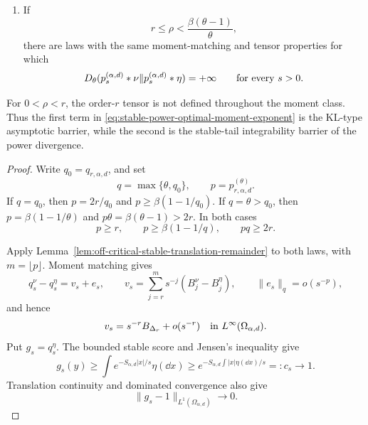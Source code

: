 \begin{theorem}
\begin{enumerate}[label=\textup{(\roman*)}]
\item If
\[
 r\le\rho<\frac{\beta(\theta-1)}\theta,
\]
there are laws with the same moment-matching and tensor properties for
which
\begin{equation}\label{eq:stable-power-domain-sharpness}
 D_\theta(p_s^{(\alpha,d)}*\nu\|
          p_s^{(\alpha,d)}*\eta)=+\infty
 \qquad\hbox{for every }s>0.
\end{equation}
\end{enumerate}
For \(0<\rho<r\), the order-\(r\) tensor is not defined throughout the
moment class.  Thus the first term in
\eqref{eq:stable-power-optimal-moment-exponent} is the KL-type asymptotic
barrier, while the second is the stable-tail integrability barrier of the
power divergence.
\end{theorem}

\begin{proof}
Write \(q_0=q_{r,\alpha,d}\), and set
\[
 q=\max\{\theta,q_0\},
 \qquad p=p_{r,\alpha,d}^{(\theta)}.
\]
If \(q=q_0\), then \(p=2r/q_0\) and
\(p\ge\beta(1-1/q_0)\).  If \(q=\theta>q_0\), then
\(p=\beta(1-1/\theta)\) and \(p\theta=\beta(\theta-1)>2r\).
In both cases
\begin{equation}\label{eq:stable-power-balance-relations}
 p\ge r,\qquad p\ge\beta(1-1/q),\qquad pq\ge2r.
\end{equation}

Apply Lemma~\ref{lem:off-critical-stable-translation-remainder} to both
laws, with \(m=\lfloor p\rfloor\).  Moment matching gives
\[
 q_s^\nu-q_s^\eta=v_s+e_s,
 \qquad
 v_s=\sum_{j=r}^m s^{-j}(B_j^\nu-B_j^\eta),
 \qquad
 \|e_s\|_q=o(s^{-p}),
\]
and hence
\begin{equation}\label{eq:stable-power-leading-mode-convergence}
 v_s=s^{-r}B_{\Delta_r}+o(s^{-r})
 \quad\hbox{in }L^\infty(\Omega_{\alpha,d}).
\end{equation}
Put \(g_s=q_s^\eta\).  The bounded stable score and Jensen's inequality
give
\[
 g_s(y)\ge
 \int e^{-S_{\alpha,d}|x|/s}\eta(\dd x)
 \ge e^{-S_{\alpha,d}\int|x|\eta(\dd x)/s}=:c_s\longrightarrow1.
\]
Translation continuity and dominated convergence also give
\begin{equation}\label{eq:stable-power-background-convergence}
 \|g_s-1\|_{L^1(\Omega_{\alpha,d})}\longrightarrow0.
\end{equation}


\end{proof}
